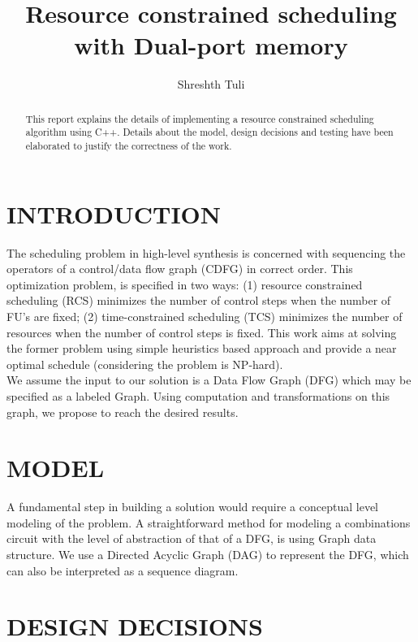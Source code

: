 \documentclass[letterpaper, 10 pt, conference]{ieeeconf}  %
\title{\LARGE \bf
Resource constrained scheduling with Dual-port memory
}
\author{Shreshth Tuli%
}
\begin{document}
\maketitle
\thispagestyle{empty}
\pagestyle{empty}


\begin{abstract}

This report explains the details of implementing a resource constrained scheduling algorithm using C++. Details about the model, design decisions and testing have been elaborated to justify the correctness of the work.

\end{abstract}


\section{INTRODUCTION}

The scheduling problem in high-level synthesis is concerned with sequencing the operators of a control/data flow graph (CDFG) in correct order. This optimization problem, is specified in two ways: (1) resource constrained scheduling (RCS) minimizes the number of control steps when the number of FU's are fixed; (2) time-constrained scheduling (TCS) minimizes the number of resources when the number of control
steps is fixed. This work aims at solving the former problem using simple heuristics based approach and provide a near optimal schedule (considering the problem is NP-hard). \\
We assume the input to our solution is a Data Flow Graph (DFG) which may be specified as a labeled Graph. Using computation and transformations on this graph, we propose to reach the desired results.

\section{MODEL}

A fundamental step in building a solution would require a conceptual level modeling of the problem. A straightforward method for modeling a combinations circuit with the level of abstraction of that of a DFG, is using Graph data structure. We use a Directed Acyclic Graph (DAG) to represent the DFG, which can also be interpreted as a sequence diagram. 

\section{DESIGN DECISIONS}
\end{document}
